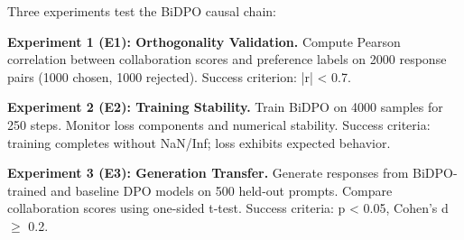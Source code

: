 
Three experiments test the BiDPO causal chain:

\textbf{Experiment 1 (E1): Orthogonality Validation.} Compute Pearson correlation between collaboration scores and preference labels on 2000 response pairs (1000 chosen, 1000 rejected). Success criterion: |r| < 0.7.

\textbf{Experiment 2 (E2): Training Stability.} Train BiDPO on 4000 samples for 250 steps. Monitor loss components and numerical stability. Success criteria: training completes without NaN/Inf; loss exhibits expected behavior.

\textbf{Experiment 3 (E3): Generation Transfer.} Generate responses from BiDPO-trained and baseline DPO models on 500 held-out prompts. Compare collaboration scores using one-sided t-test. Success criteria: p < 0.05, Cohen's d $\geq$ 0.2.


